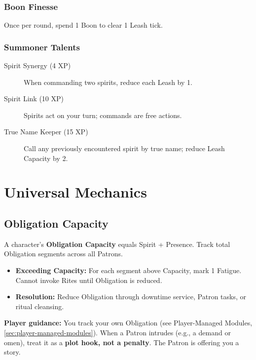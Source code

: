 \subsubsection*{Boon Finesse}
\label{sec:boon-finesse}
Once per round, spend 1 Boon to clear 1 Leash tick.

\subsubsection*{Summoner Talents}
\label{sec:summoner-talents}
\begin{description}
  \item[Spirit Synergy (4 XP)] When commanding two spirits, reduce each Leash by 1.
  \item[Spirit Link (10 XP)] Spirits act on your turn; commands are free actions.
  \item[True Name Keeper (15 XP)] Call any previously encountered spirit by true name; reduce Leash Capacity by 2.
\end{description}

\section{Universal Mechanics}
\label{sec:universal-magic-mechanics}

\subsection{Obligation Capacity}
\label{sec:obligation-capacity}

A character's \textbf{Obligation Capacity} equals Spirit + Presence.  
Track total Obligation segments across all Patrons.

\begin{itemize}
  \item \textbf{Exceeding Capacity:} For each segment above Capacity, mark 1 Fatigue. Cannot invoke Rites until Obligation is reduced.
  \item \textbf{Resolution:} Reduce Obligation through downtime service, Patron tasks, or ritual cleansing.
\end{itemize}

\noindent\textbf{Player guidance:} You track your own Obligation (see Player-Managed Modules, \ref{sec:player-managed-modules}). When a Patron intrudes (e.g., a demand or omen), treat it as a \textbf{plot hook, not a penalty}. The Patron is offering you a story.

